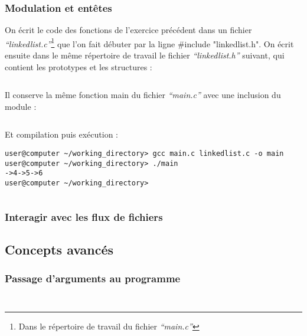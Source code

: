 \documentclass[../main.tex]{subfiles}
\begin{document}
\subsubsection{Modulation et entêtes}
 \newline
On écrit le code des fonctions de l'exercice précédent dans un fichier \textit{``linkedlist.c''}\footnote{Dans le répertoire de travail du fichier \textit{``main.c''}} que l'on fait débuter par la ligne \textsf{\#include "linkedlist.h"}. On écrit ensuite dans le même répertoire de travail le fichier \textit{``linkedlist.h''} suivant, qui contient les prototypes et les structures :
\inputminted{c}{solutions/linkedlist_2.h}
Il conserve la même fonction \textsf{main} du fichier \textit{``main.c''} avec une inclusion du module :
\inputminted{c}{solutions/linkedlist_2.c}
Et compilation puis exécution :
\begin{verbatim}
user@computer ~/working_directory> gcc main.c linkedlist.c -o main
user@computer ~/working_directory> ./main
->4->5->6
user@computer ~/working_directory>
\end{verbatim}
\inputminted{c}{solutions/calculatrice.c}
\subsubsection{Interagir avec les flux de fichiers}
\subsection{Concepts avancés}
\subsubsection{Passage d'arguments au programme}
\inputminted{c}{solutions/list_args.c}
\inputminted{c}{solutions/cat.c}
\end{document}
